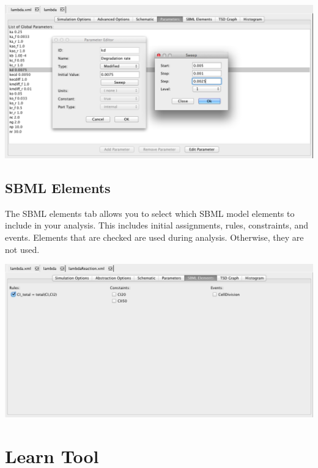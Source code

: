 \documentclass[titlepage,11pt]{article}
\begin{document}
\begin{center}
\includegraphics[width=160mm]{screenshots/parameterEditor}
\end{center}

\subsection{\label{SBMLElements}SBML Elements}

\noindent
The SBML elements tab allows you to select which SBML model elements to include in your analysis.  This includes initial assignments, rules, constraints, and events.  Elements that are checked are used during analysis.  Otherwise, they are not used.

\begin{center}
\includegraphics[width=160mm]{screenshots/SBMLElements}
\end{center}

\clearpage

\section{\label{Learn}Learn Tool}
\end{document}
